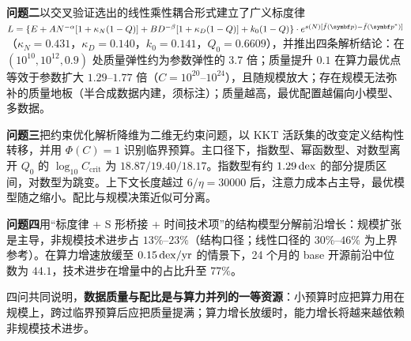 \textbf{问题二}以交叉验证选出的线性乘性耦合形式建立了广义标度律 $L=\{E+AN^{-\alpha}[1+\kappa_N(1-Q)]+BD^{-\beta}[1+\kappa_D(1-Q)]+k_0(1-Q)\}\cdot e^{s(N)[\bar f(\bp)-\bar f(\bp^*)]}$（$\kappa_N=0.431$，$\kappa_D=0.140$，$k_0=0.141$，$Q_0=0.6609$），并推出四条解析结论：在 $(10^{10},10^{12},0.9)$ 处质量弹性约为参数弹性的 $3.7$ 倍；质量提升 $0.1$ 在算力最优点等效于参数扩大 $1.29$–$1.77$ 倍（$C=10^{20}$–$10^{24}$），且随规模放大；存在规模无法弥补的质量地板（半合成数据内建，须标注）；质量越高，最优配置越偏向小模型、多数据。

\textbf{问题三}把约束优化解析降维为二维无约束问题，以 KKT 活跃集的改变定义结构性转移，并用 $\Phi(C)=1$ 识别临界预算。主口径下，指数型、幂函数型、对数型离开 $Q_0$ 的 $\log_{10}C_{\mathrm{crit}}$ 为 $18.87/19.40/18.17$。指数型有约 $1.29\,\mathrm{dex}$ 的部分提质区间，对数型为跳变。上下文长度越过 $6/\eta=30000$ 后，注意力成本占主导，最优模型随之缩小。配比与规模决策近似可分离。

\textbf{问题四}用“标度律 + S 形桥接 + 时间技术项”的结构模型分解前沿增长：规模扩张是主导，非规模技术进步占 $13\%$–$23\%$（结构口径；线性口径的 $30\%$–$46\%$ 为上界参考）。在算力增速放缓至 $0.15\,\mathrm{dex}/\mathrm{yr}$ 的情景下，24 个月的 base 开源前沿中位数为 $44.1$，技术进步在增量中的占比升至 $77\%$。

四问共同说明，\textbf{数据质量与配比是与算力并列的一等资源}：小预算时应把算力用在规模上，跨过临界预算后应把质量提满；算力增长放缓时，能力增长将越来越依赖非规模技术进步。

